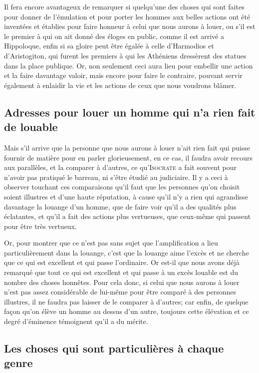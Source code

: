 \bigbreak

Il fera encore avantageux de remarquer si quelqu'une des choses qui sont faites pour donner de l'émulation et pour
porter les hommes aux belles actions ont été inventées et établies pour faire honneur à celui que nous aurons à louer,
ou s'il est le premier à qui on ait donné des éloges en public, comme il est arrivé a Hippoloque, enfin si sa gloire
peut être égalée à celle d'Harmodios et d'Aristogiton, qui furent les premiers à qui les Athéniens dressèrent des
statues dans la place publique. Or, non seulement ceci aura lieu pour embellir une action et la faire davantage valoir,
mais encore pour faire le contraire, pouvant servir également à enlaidir la vie et les actions de ceux que nous
voudrons blâmer. 

\subsection{Adresses pour louer un homme qui n'a rien fait de louable}

Mais s'il arrive que la personne que nous aurons à louer n'ait rien fait qui puisse fournir de matière pour en parler
glorieusement, en ce cas, il faudra avoir recours aux parallèles, et la comparer à d'autres, ce qu'\textsc{Isocrate} a
fait souvent pour n'avoir pas pratiqué le barreau, ni s'être étudié au judiciaire. Il y a ceci à observer touchant ces
comparaisons qu'il faut que les personnes qu'on choisit soient illustres et d'une haute réputation, à cause qu'il n'y
a rien qui agrandisse davantage la louange d'un homme, que de faire voir qu'il a des qualités plus éclatantes, et qu'il
a fait des actions plus vertueuses, que ceux-même qui passent pour être très vertueux.

Or, pour montrer que ce n'est pas sans sujet que l'amplification a lieu particulièrement dans la louange, c'est que la
louange aime l’excès et ne cherche que ce qui est excellent et qui passe l'ordinaire. Or est-il que nous avons déjà
remarqué que tout ce qui est excellent et qui passe à un excès louable est du nombre des choses honnêtes. Pour cela
donc, si celui que nous aurons à louer n'est pas assez considérable de lui-même pour être comparé à des personnes
illustres, il ne faudra pas laisser de le comparer à d'autres; car enfin, de quelque façon qu'on élève un homme au
dessus d'un autre, toujours cette élévation et ce degré d'éminence témoignent qu'il a du mérite.

\subsection{Les choses qui sont particulières à chaque genre}

